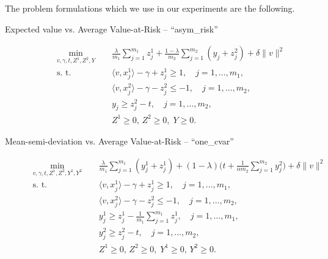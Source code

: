 \documentclass[10pt,letterpaper]{article}
\newcommand{\1}{1{\hskip -2.55 pt}\hbox{I}}
\begin{document}
The problem formulations which we use in our experiments are the following.
\begin{description}

  \item[Expected value vs. Average Value-at-Risk -- ``asym\_risk'']
    \begin{equation}
      \label{p:RSSVM-E-cvar}
      \begin{aligned}
      \min_{v,\gamma,t,Z^1,Z^2,Y}\quad  &\,  \frac{\lambda}{m_1}\sum_{j=1}^{m_1} z^1_j+ 
                \frac{1-\lambda}{m_2}\sum_{j=1}^{m_2} (y_j+z^2_j) +\delta\|v\|^2 \\
      \text{s. t. }\quad  &\, \langle v, x^1_j\rangle - \gamma + z_j^1 \ge 1, \quad j=1,\dots,m_1, \\
      &\, \langle v, x^2_{j}\rangle -\gamma  - z_{j}^2 \le -1,\quad j=1,\dots ,m_2,\\
      &\, y_j \geq z_j^2-t,\quad j=1,\dots ,m_2,\\
      &\, Z^1\ge 0,\, Z^2\geq 0,\; Y\ge 0. 
      \end{aligned}
    \end{equation}

  \item[Mean-semi-deviation vs. Average Value-at-Risk -- ``one\_cvar'']
    \begin{equation}
      \label{p:RSSVM-msd-cvar}
      \begin{aligned}
      \min_{v,\gamma,t,Z^1,Z^2,Y^1,Y^2}\quad  &\,  \frac{\lambda}{m_1}\sum_{j=1}^{m_1} (y^1_j+z^1_j) + (1-\lambda)\big(t + \frac{1}{\alpha m_2}\sum_{j=1}^{m_2} y^2_j\big) +\delta\|v\|^2 \\
      \text{s. t. }\quad  &\, \langle v, x^1_j\rangle - \gamma + z_j^1 \ge 1, \quad j=1,\dots,m_1, \\
      &\, \langle v, x^2_{j}\rangle -\gamma  - z_{j}^2 \le -1, \quad j=1,\dots ,m_2,\\
      &\, y_j^1 \geq z_j^1-\frac{1}{m_1}\sum_{j=1}^{m_1} z^1_j,\quad j=1,\dots ,m_1,\\
      &\, y_j^2 \geq z_j^2-t,\quad j=1,\dots ,m_2,\\
      &\, Z^1\ge 0,\, Z^2\geq 0,\; Y^1\ge 0,\, Y^2\geq 0. 
      \end{aligned}
    \end{equation}


\end{description}
\end{document}
